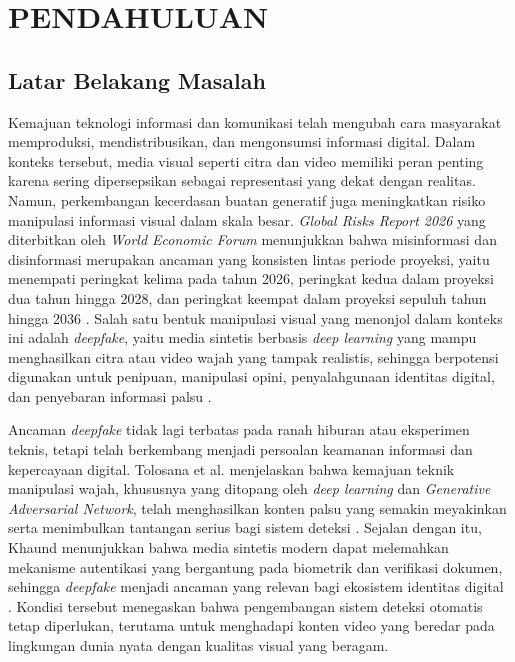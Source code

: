 \newpage
\chapter{PENDAHULUAN} \label{Bab I}

\section{Latar Belakang Masalah} \label{I.Latar Belakang}
Kemajuan teknologi informasi dan komunikasi telah mengubah cara masyarakat memproduksi, mendistribusikan, dan mengonsumsi informasi digital. Dalam konteks tersebut, media visual seperti citra dan video memiliki peran penting karena sering dipersepsikan sebagai representasi yang dekat dengan realitas. Namun, perkembangan kecerdasan buatan generatif juga meningkatkan risiko manipulasi informasi visual dalam skala besar. \textit{Global Risks Report 2026} yang diterbitkan oleh \textit{World Economic Forum} menunjukkan bahwa misinformasi dan disinformasi merupakan ancaman yang konsisten lintas periode proyeksi, yaitu menempati peringkat kelima pada tahun 2026, peringkat kedua dalam proyeksi dua tahun hingga 2028, dan peringkat keempat dalam proyeksi sepuluh tahun hingga 2036 \cite{WorldEconomicForumWEF2026}. Salah satu bentuk manipulasi visual yang menonjol dalam konteks ini adalah \textit{deepfake}, yaitu media sintetis berbasis \textit{deep learning} yang mampu menghasilkan citra atau video wajah yang tampak realistis, sehingga berpotensi digunakan untuk penipuan, manipulasi opini, penyalahgunaan identitas digital, dan penyebaran informasi palsu \cite{Tolosana2020}\cite{Mirsky_2021}\cite{BhaskardeepKhaund2025}. \par

Ancaman \textit{deepfake} tidak lagi terbatas pada ranah hiburan atau eksperimen teknis, tetapi telah berkembang menjadi persoalan keamanan informasi dan kepercayaan digital. Tolosana et al. menjelaskan bahwa kemajuan teknik manipulasi wajah, khususnya yang ditopang oleh \textit{deep learning} dan \textit{Generative Adversarial Network}, telah menghasilkan konten palsu yang semakin meyakinkan serta menimbulkan tantangan serius bagi sistem deteksi \cite{Tolosana2020}. Sejalan dengan itu, Khaund menunjukkan bahwa media sintetis modern dapat melemahkan mekanisme autentikasi yang bergantung pada biometrik dan verifikasi dokumen, sehingga \textit{deepfake} menjadi ancaman yang relevan bagi ekosistem identitas digital \cite{BhaskardeepKhaund2025}. Kondisi tersebut menegaskan bahwa pengembangan sistem deteksi otomatis tetap diperlukan, terutama untuk menghadapi konten video yang beredar pada lingkungan dunia nyata dengan kualitas visual yang beragam. \par

